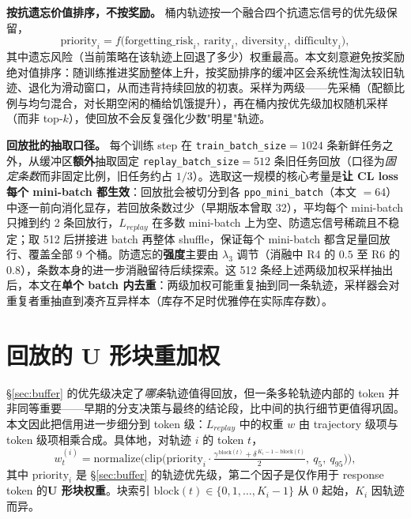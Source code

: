 \textbf{按抗遗忘价值排序，不按奖励。} 桶内轨迹按一个融合四个抗遗忘信号的优先级保留，
\begin{equation}
\label{eq:priority}
\text{priority}_i = f\big(\text{forgetting\_risk}_i,\ \text{rarity}_i,\ \text{diversity}_i,\ \text{difficulty}_i\big),
\end{equation}
其中遗忘风险（当前策略在该轨迹上回退了多少）权重最高。本文刻意避免按奖励绝对值排序：随训练推进奖励整体上升，按奖励排序的缓冲区会系统性淘汰较旧轨迹、退化为滑动窗口，从而违背持续回放的初衷。采样为两级——先采桶（配额比例与均匀混合，对长期空闲的桶给饥饿提升），再在桶内按优先级加权随机采样（而非 top-$k$），使回放不会反复强化少数"明星"轨迹。

\textbf{回放批的抽取口径。} 每个训练 step 在 \texttt{train\_batch\_size}$=1024$ 条新鲜任务之外，从缓冲区\textbf{额外}抽取固定 \texttt{replay\_batch\_size}$=512$ 条旧任务回放（口径为\textit{固定条数}而非固定比例，旧任务约占 $1/3$）。选取这一规模的核心考量是\textbf{让 CL loss 每个 mini-batch 都生效}：回放批会被切分到各 \texttt{ppo\_mini\_batch}（本文 $=64$）中逐一前向消化显存，若回放条数过少（早期版本曾取 32），平均每个 mini-batch 只摊到约 2 条回放行，$L_{replay}$ 在多数 mini-batch 上为空、防遗忘信号稀疏且不稳定；取 512 后拼接进 batch 再整体 shuffle，保证每个 mini-batch 都含足量回放行、覆盖全部 9 个桶。防遗忘的\textbf{强度}主要由 $\lambda_3$ 调节（消融中 R4 的 $0.5$ 至 R6 的 $0.8$），条数本身的进一步消融留待后续探索。这 512 条经上述两级加权采样抽出后，本文在\textbf{单个 batch 内去重}：两级加权可能重复抽到同一条轨迹，采样器会对重复者重抽直到凑齐互异样本（库存不足时优雅停在实际库存数）。

\section{回放的 U 形块重加权}
\label{sec:reweight}

\S\ref{sec:buffer} 的优先级决定了\textit{哪条}轨迹值得回放，但一条多轮轨迹内部的 token 并非同等重要——早期的分支决策与最终的结论段，比中间的执行细节更值得巩固。本文因此把信用进一步细分到 token 级：$L_{replay}$ 中的权重 $w$ 由 trajectory 级项与 token 级项相乘合成。具体地，对轨迹 $i$ 的 token $t$，
\begin{equation}
\label{eq:weight}
w_t^{(i)} = \mathrm{normalize}\Big(\mathrm{clip}\big(\text{priority}_i \cdot \tfrac{\gamma^{\,\mathrm{block}(t)} + \delta^{\,K_i - 1 - \mathrm{block}(t)}}{2},\ q_5,\ q_{95}\big)\Big),
\end{equation}
其中 $\text{priority}_i$ 是 \S\ref{sec:buffer} 的轨迹优先级，第二个因子是仅作用于 response token 的\textbf{U 形块权重}。块索引 $\mathrm{block}(t)\in\{0,1,\dots,K_i-1\}$ 从 0 起始，$K_i$ 因轨迹而异。

